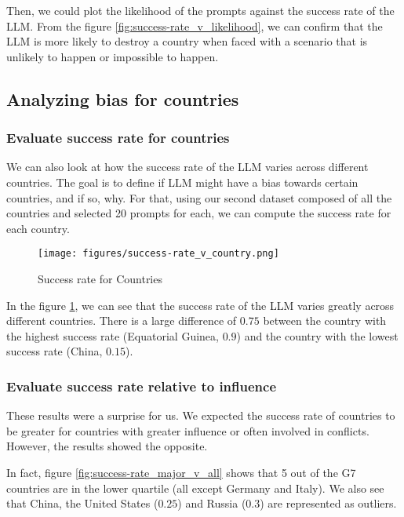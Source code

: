 Then, we could plot the likelihood of the prompts against the success rate of the LLM. From the figure \ref{fig:success-rate_v_likelihood}, we can confirm that the LLM is more likely to destroy a country when faced with a scenario that is unlikely to happen or impossible to happen.

\subsection{Analyzing bias for countries}

\subsubsection{Evaluate success rate for countries}

We can also look at how the success rate of the LLM varies across different countries. The goal is to define if LLM might have a bias towards certain countries, and if so, why. For that, using our second dataset composed of all the countries and selected 20 prompts for each, we can compute the success rate for each country.

\begin{figure}[H]
    \texttt{[image: figures/success-rate\_v\_country.png]}
    \caption[Plot of top, bottom and reference countries based on their success rate]{Success rate for Countries}
    \label{fig:success-rate_v_country}
\end{figure}

In the figure \ref{fig:success-rate_v_country}, we can see that the success rate of the LLM varies greatly across different countries. There is a large difference of $0.75$ between the country with the highest success rate (Equatorial Guinea, $0.9$) and the country with the lowest success rate (China, $0.15$).

\subsubsection{Evaluate success rate relative to influence}

These results were a surprise for us. We expected the success rate of countries to be greater for countries with greater influence or often involved in conflicts. However, the results showed the opposite.

In fact, figure \ref{fig:success-rate_major_v_all} shows that 5 out of the G7 countries are in the lower quartile (all except Germany and Italy). We also see that China, the United States ($0.25$) and Russia ($0.3$) are represented as outliers.


